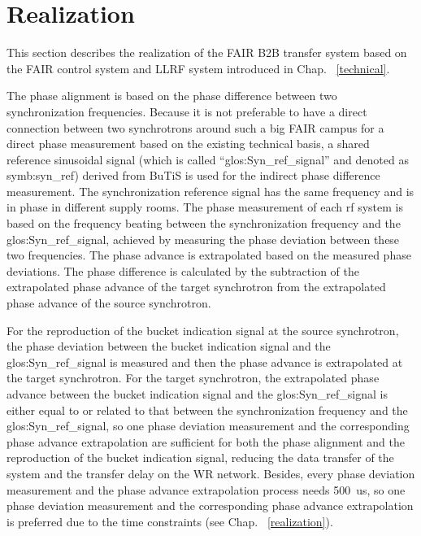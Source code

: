 %
% 
\section{Realization}
This section describes the realization of the FAIR B2B transfer system based on the FAIR control system and LLRF system introduced in Chap. ~\ref{technical}.

The phase alignment is based on the phase difference between two synchronization frequencies. Because it is not preferable to have a direct connection between two synchrotrons around such a big FAIR campus for a direct phase measurement based on the existing technical basis, a shared reference sinusoidal signal (which is called “\gls{glos:Syn_ref_signal}” and denoted as \gls{symb:syn_ref}) derived from BuTiS is used for the indirect phase difference measurement. The synchronization reference signal has the same frequency and is in phase in different supply rooms. The phase measurement of each rf system is based on the frequency beating between the synchronization frequency and the \gls{glos:Syn_ref_signal}, achieved by measuring the phase deviation between these two frequencies. The phase advance is extrapolated based on the measured phase deviations. The phase difference is calculated by the subtraction of the extrapolated phase advance of the target synchrotron from the extrapolated phase advance of the source synchrotron. 

For the reproduction of the bucket indication signal at the source synchrotron, the phase deviation between the bucket indication signal and the \gls{glos:Syn_ref_signal} is measured and then the phase advance is extrapolated at the target synchrotron. For the target synchrotron, the extrapolated phase advance between the bucket indication signal and the \gls{glos:Syn_ref_signal} is either equal to or related to that between the synchronization frequency and the \gls{glos:Syn_ref_signal}, so one phase deviation measurement and the corresponding phase advance extrapolation are sufficient for both the phase alignment and the reproduction of the bucket indication signal, reducing the data transfer of the system and the transfer delay on the WR network. Besides, every phase deviation measurement and the phase advance extrapolation process needs \SI{500}{us}, so one phase deviation measurement and the corresponding phase advance extrapolation is preferred due to the time constraints (see Chap. ~\ref{realization}).

